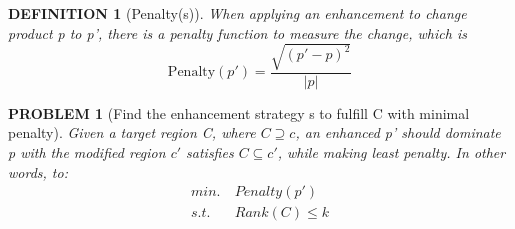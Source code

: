 \documentclass{IEEEtran}%
\newtheorem{definition}{D\scriptsize EFINITION}
\newtheorem{problem}{P\scriptsize ROBLEM}
\begin{document}
	\begin{definition}[Penalty(s)]
		When applying an enhancement to change product p to p', there is a penalty function to measure the change, which is 
		\[\text{Penalty}(p') = \frac{\sqrt{(p'-p)^2}}{|p|}\]
	\end{definition}
	
	\begin{problem}[Find the enhancement strategy s to fulfill C with minimal penalty]
        Given a target region C, where $C \supseteq c $, an enhanced p' should dominate p with the modified region $c'$ satisfies $C \subseteq c'$, while making least penalty. In other words, to:
        \begin{align*}
       min. \   &Penalty(p')\\
        s.t.    \ &Rank(C) \le k 
        \end{align*}
	\end{problem}
\end{document}
